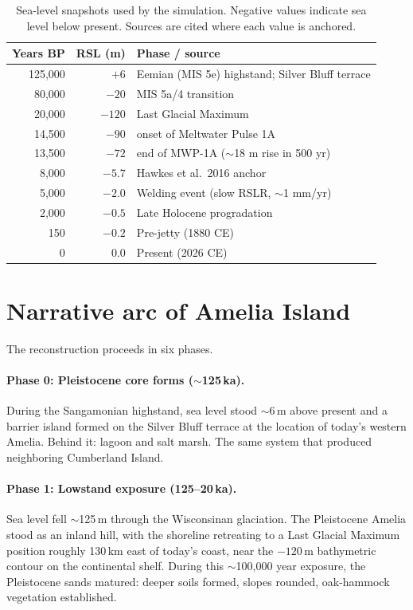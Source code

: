 \documentclass[11pt]{article}
\begin{document}
\begin{table}[h]
\centering
\caption{Sea-level snapshots used by the simulation. Negative values indicate sea
level below present. Sources are cited where each value is anchored.}
\label{tab:sealevel}
\begin{tabular}{rrl}
\toprule
\textbf{Years BP} & \textbf{RSL (m)} & \textbf{Phase / source} \\
\midrule
125{,}000 & $+6$ & Eemian (MIS 5e) highstand; Silver Bluff terrace \\
\phantom{1}80{,}000 & $-20$ & MIS 5a/4 transition \\
\phantom{1}20{,}000 & $-120$ & Last Glacial Maximum \\
\phantom{1}14{,}500 & $-90$ & onset of Meltwater Pulse 1A \\
\phantom{1}13{,}500 & $-72$ & end of MWP-1A ($\sim$18 m rise in 500 yr) \\
\phantom{11}8{,}000 & $-5.7$ & Hawkes et al.\ 2016 anchor \\
\phantom{11}5{,}000 & $-2.0$ & Welding event (slow RSLR, $\sim$1 mm/yr) \\
\phantom{11}2{,}000 & $-0.5$ & Late Holocene progradation \\
\phantom{1111}150 & $-0.2$ & Pre-jetty (1880 CE) \\
\phantom{11111}0 & $\phantom{-}0.0$ & Present (2026 CE) \\
\bottomrule
\end{tabular}
\end{table}

\section{Narrative arc of Amelia Island}

The reconstruction proceeds in six phases.

\paragraph{Phase 0: Pleistocene core forms ($\sim$125\,ka).}
During the Sangamonian highstand, sea level stood $\sim$6\,m above present and a
barrier island formed on the Silver Bluff terrace at the location of today's
western Amelia. Behind it: lagoon and salt marsh. The same system that produced
neighboring Cumberland Island.

\paragraph{Phase 1: Lowstand exposure (125--20\,ka).}
Sea level fell $\sim$125\,m through the Wisconsinan glaciation. The Pleistocene
Amelia stood as an inland hill, with the shoreline retreating to a Last Glacial
Maximum position roughly 130\,km east of today's coast, near the $-120$\,m
bathymetric contour on the continental shelf. During this $\sim$100{,}000 year
exposure, the Pleistocene sands matured: deeper soils formed, slopes rounded,
oak-hammock vegetation established.
\end{document}

